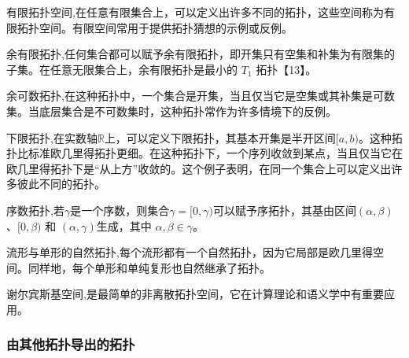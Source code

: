 有限拓扑空间,在任意有限集合上，可以定义出许多不同的拓扑，这些空间称为有限拓扑空间。有限空间常用于提供拓扑猜想的示例或反例。

余有限拓扑,任何集合都可以赋予余有限拓扑，即开集只有空集和补集为有限集的子集。在任意无限集合上，余有限拓扑是最小的 $T_1$ 拓扑【13】。

余可数拓扑,在这种拓扑中，一个集合是开集，当且仅当它是空集或其补集是可数集。当底层集合是不可数集时，这种拓扑常作为许多情境下的反例。

下限拓扑,在实数轴$\mathbb{R}$上，可以定义下限拓扑，其基本开集是半开区间$[a, b)$。这种拓扑比标准欧几里得拓扑更细。在这种拓扑下，一个序列收敛到某点，当且仅当它在欧几里得拓扑下是“从上方”收敛的。这个例子表明，在同一个集合上可以定义出许多彼此不同的拓扑。

序数拓扑,若$\gamma$是一个序数，则集合$\gamma = [0, \gamma)$可以赋予序拓扑，其基由区间$(\alpha, \beta)$、$[0, \beta)$ 和 $(\alpha, \gamma)$生成，其中 $\alpha, \beta \in \gamma$。

流形与单形的自然拓扑,每个流形都有一个自然拓扑，因为它局部是欧几里得空间。同样地，每个单形和单纯复形也自然继承了拓扑。

谢尔宾斯基空间,是最简单的非离散拓扑空间，它在计算理论和语义学中有重要应用。
\subsubsection{由其他拓扑导出的拓扑}
